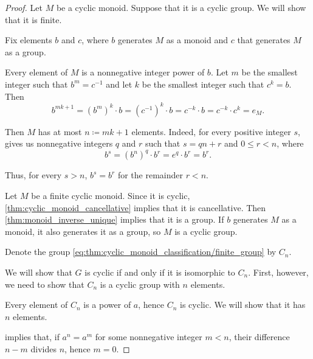 \begin{proof}

  \SufficiencySubProof* Let \( M \) be a cyclic monoid. Suppose that it is a cyclic group. We will show that it is finite.

  Fix elements \( b \) and \( c \), where \( b \) generates \( M \) as a monoid and \( c \) that generates \( M \) as a group.

  Every element of \( M \) is a nonnegative integer power of \( b \). Let \( m \) be the smallest integer such that \( b^m = c^{-1} \) and let \( k \) be the smallest integer such that \( c^k = b \). Then
  \begin{equation*}
    b^{mk + 1} = (b^m)^k \cdot b = (c^{-1})^k \cdot b = c^{-k} \cdot b = c^{-k} \cdot c^k = e_M.
  \end{equation*}

  Then \( M \) has at most \( n \coloneqq mk + 1 \) elements. Indeed, for every positive integer \( s \),  gives us nonnegative integers \( q \) and \( r \) such that \( s = qn + r \) and \( 0 \leq r < n \), where
  \begin{equation*}
    b^s
    =
    (b^n)^q \cdot b^r
    =
    e^q \cdot b^r
    =
    b^r.
  \end{equation*}

  Thus, for every \( s > n \), \( b^s = b^r \) for the remainder \( r < n \).

  \NecessitySubProof* Let \( M \) be a finite cyclic monoid. Since it is cyclic, \cref{thm:cyclic_monoid_cancellative} implies that it is cancellative. Then \cref{thm:monoid_inverse_unique} implies that it is a group. If \( b \) generates \( M \) as a monoid, it also generates it as a group, so \( M \) is a cyclic group.

   Denote the group \eqref{eq:thm:cyclic_monoid_classification/finite_group} by \( C_n \).

  We will show that \( G \) is cyclic if and only if it is isomorphic to \( C_n \). First, however, we need to show that \( C_n \) is a cyclic group with \( n \) elements.

   Every element of \( C_n \) is a power of \( a \), hence \( C_n \) is cyclic. We will show that it has \( n \) elements.

   implies that, if \( a^n = a^m \) for some nonnegative integer \( m < n \), their difference \( n - m \) divides \( n \), hence \( m = 0 \).


\end{proof}
